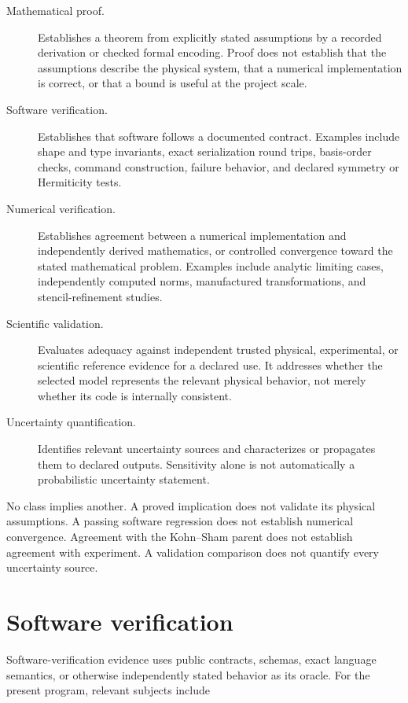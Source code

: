 \begin{description}
  \item[Mathematical proof.] Establishes a theorem from explicitly stated
    assumptions by a recorded derivation or checked formal encoding. Proof does
    not establish that the assumptions describe the physical system, that a
    numerical implementation is correct, or that a bound is useful at the
    project scale.
  \item[Software verification.] Establishes that software follows a documented
    contract. Examples include shape and type invariants, exact serialization
    round trips, basis-order checks, command construction, failure behavior,
    and declared symmetry or Hermiticity tests.
  \item[Numerical verification.] Establishes agreement between a numerical
    implementation and independently derived mathematics, or controlled
    convergence toward the stated mathematical problem. Examples include
    analytic limiting cases, independently computed norms, manufactured
    transformations, and stencil-refinement studies.
  \item[Scientific validation.] Evaluates adequacy against independent trusted
    physical, experimental, or scientific reference evidence for a declared
    use. It addresses whether the selected model represents the relevant
    physical behavior, not merely whether its code is internally consistent.
  \item[Uncertainty quantification.] Identifies relevant uncertainty sources and
    characterizes or propagates them to declared outputs. Sensitivity alone is
    not automatically a probabilistic uncertainty statement.
\end{description}

No class implies another. A proved implication does not validate its physical
assumptions. A passing software regression does not establish numerical
convergence. Agreement with the Kohn--Sham parent does not establish
agreement with experiment. A validation comparison does not quantify every
uncertainty source.

\section{Software verification}

Software-verification evidence uses public contracts, schemas, exact language
semantics, or otherwise independently stated behavior as its oracle. For the
present program, relevant subjects include

